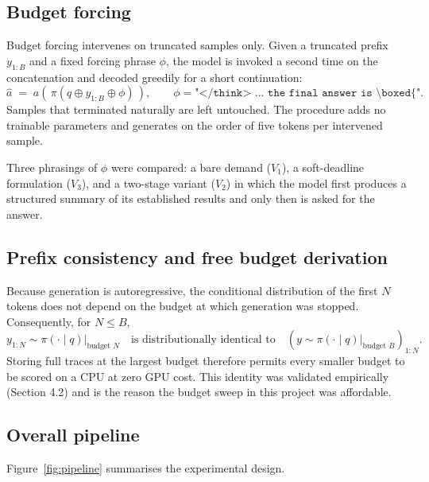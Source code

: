 \documentclass[12pt,a4paper,oneside]{report}
\begin{document}
\subsection{Budget forcing}

Budget forcing intervenes on truncated samples only. Given a truncated prefix
$y_{1:B}$ and a fixed forcing phrase $\phi$, the model is invoked a second time
on the concatenation and decoded greedily for a short continuation:
\begin{equation}
\hat{a} \;=\; a\!\left(\,\pi\!\left(q \oplus y_{1:B} \oplus \phi\right)\,\right),
\qquad
\phi = \texttt{"</think> ... the final answer is \textbackslash boxed\{"} .
\label{eq:forcing}
\end{equation}
Samples that terminated naturally are left untouched. The procedure adds no
trainable parameters and generates on the order of five tokens per intervened
sample.

Three phrasings of $\phi$ were compared: a bare demand ($V_1$), a soft-deadline
formulation ($V_3$), and a two-stage variant ($V_2$) in which the model first
produces a structured summary of its established results and only then is asked
for the answer.

\subsection{Prefix consistency and free budget derivation}

Because generation is autoregressive, the conditional distribution of the first
$N$ tokens does not depend on the budget at which generation was stopped.
Consequently, for $N \le B$,
\begin{equation}
y_{1:N} \sim \pi(\cdot \mid q) \Big|_{\text{budget } N}
\quad\text{is distributionally identical to}\quad
\left(y \sim \pi(\cdot \mid q)\Big|_{\text{budget } B}\right)_{1:N}.
\label{eq:prefix}
\end{equation}
Storing full traces at the largest budget therefore permits every smaller budget
to be scored on a CPU at zero GPU cost. This identity was validated empirically
(Section 4.2) and is the reason the budget sweep in this project was affordable.

\subsection{Overall pipeline}

Figure~\ref{fig:pipeline} summarises the experimental design.
\end{document}
